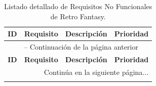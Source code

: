\begin{center}
\small
\begin{longtable}{|l|p{3.5cm}|p{7.5cm}|c|}
    \caption{Listado detallado de Requisitos No Funcionales de Retro Fantasy.}
    \label{tab:requisitos_no_funcionales} \\
    \hline
    \textbf{ID} & \textbf{Requisito} & \textbf{Descripción} & \textbf{Prioridad} \\
    \hline
    \endfirsthead

    \multicolumn{4}{c}{{\tablename\ \thetable{} -- Continuación de la página anterior}} \\
    \hline
    \textbf{ID} & \textbf{Requisito} & \textbf{Descripción} & \textbf{Prioridad} \\
    \hline
    \endhead

    \hline
    \multicolumn{4}{|r|}{{Continúa en la siguiente página...}} \\
    \hline
    \endfoot

    \hline
    \endlastfoot


\end{longtable}
\end{center}

